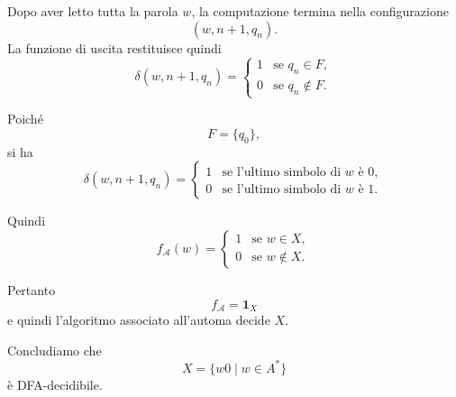\begin{sol}
Dopo aver letto tutta la parola \(w\), la computazione termina nella configurazione
\[
(w,n+1,q_n).
\]
La funzione di uscita restituisce quindi
\[
\delta(w,n+1,q_n)=
\begin{cases}
1 & \text{se } q_n\in F,\\
0 & \text{se } q_n\notin F.
\end{cases}
\]

Poiché
\[
F=\{q_0\},
\]
si ha
\[
\delta(w,n+1,q_n)=
\begin{cases}
1 & \text{se l'ultimo simbolo di } w \text{ è }0,\\
0 & \text{se l'ultimo simbolo di } w \text{ è }1.
\end{cases}
\]

Quindi
\[
f_{\mathcal A}(w)=
\begin{cases}
1 & \text{se } w\in X,\\
0 & \text{se } w\notin X.
\end{cases}
\]

Pertanto
\[
f_{\mathcal A}=\mathbf 1_X
\]
e quindi l'algoritmo associato all'automa decide \(X\).

Concludiamo che
\[
X=\{w0\mid w\in A^*\}
\]
è DFA-decidibile.
\end{sol}
\newpage

